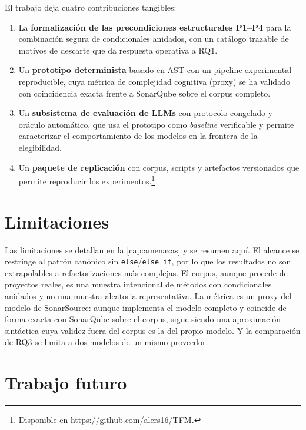 El trabajo deja cuatro contribuciones tangibles:
\begin{enumerate}
  \item La \textbf{formalización de las precondiciones estructurales P1--P4} para la
  combinación segura de condicionales anidados, con un catálogo trazable de
  motivos de descarte que da respuesta operativa a RQ1.
  \item Un \textbf{prototipo determinista} basado en AST con un pipeline
  experimental reproducible, cuya métrica de complejidad cognitiva (proxy) se
  ha validado con coincidencia exacta frente a SonarQube sobre el corpus
  completo.
  \item Un \textbf{subsistema de evaluación de LLMs} con protocolo congelado y
  oráculo automático, que usa el prototipo como \emph{baseline} verificable y
  permite caracterizar el comportamiento de los modelos en la frontera de la
  elegibilidad.
  \item Un \textbf{paquete de replicación} con corpus, scripts y artefactos
  versionados que permite reproducir los
  experimentos.\footnote{Disponible en \url{https://github.com/alers16/TFM}.}
\end{enumerate}

\section{Limitaciones}

Las limitaciones se detallan en la \autoref{cap:amenazas} y se resumen aquí. El
alcance se restringe al patrón canónico sin \lstinline|else|/\lstinline|else if|,
por lo que los resultados no son extrapolables a refactorizaciones más
complejas. El corpus, aunque procede de proyectos reales, es una muestra
intencional de métodos con condicionales anidados y no una muestra aleatoria
representativa. La métrica es un proxy del modelo de SonarSource: aunque implementa el modelo
completo y coincide de forma exacta con SonarQube sobre el corpus, sigue siendo
una aproximación sintáctica cuya validez fuera del corpus es la del propio
modelo. Y la comparación de RQ3 se limita a dos modelos de un mismo proveedor.

\section{Trabajo futuro}

